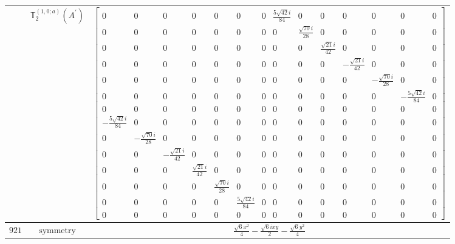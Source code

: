 \documentclass[fleqn,8pt,landscape]{jsarticle}
\begin{document}
\begin{longtable}{ccc}
$  $ & $ \mathbb{T}_{2}^{(1,0;a)}(A^{\prime}) $ & $ \begin{bmatrix} 0 & 0 & 0 & 0 & 0 & 0 & 0 & \frac{5 \sqrt{42} i}{84} & 0 & 0 & 0 & 0 & 0 & 0 \\ 0 & 0 & 0 & 0 & 0 & 0 & 0 & 0 & \frac{\sqrt{70} i}{28} & 0 & 0 & 0 & 0 & 0 \\ 0 & 0 & 0 & 0 & 0 & 0 & 0 & 0 & 0 & \frac{\sqrt{21} i}{42} & 0 & 0 & 0 & 0 \\ 0 & 0 & 0 & 0 & 0 & 0 & 0 & 0 & 0 & 0 & - \frac{\sqrt{21} i}{42} & 0 & 0 & 0 \\ 0 & 0 & 0 & 0 & 0 & 0 & 0 & 0 & 0 & 0 & 0 & - \frac{\sqrt{70} i}{28} & 0 & 0 \\ 0 & 0 & 0 & 0 & 0 & 0 & 0 & 0 & 0 & 0 & 0 & 0 & - \frac{5 \sqrt{42} i}{84} & 0 \\ 0 & 0 & 0 & 0 & 0 & 0 & 0 & 0 & 0 & 0 & 0 & 0 & 0 & 0 \\ - \frac{5 \sqrt{42} i}{84} & 0 & 0 & 0 & 0 & 0 & 0 & 0 & 0 & 0 & 0 & 0 & 0 & 0 \\ 0 & - \frac{\sqrt{70} i}{28} & 0 & 0 & 0 & 0 & 0 & 0 & 0 & 0 & 0 & 0 & 0 & 0 \\ 0 & 0 & - \frac{\sqrt{21} i}{42} & 0 & 0 & 0 & 0 & 0 & 0 & 0 & 0 & 0 & 0 & 0 \\ 0 & 0 & 0 & \frac{\sqrt{21} i}{42} & 0 & 0 & 0 & 0 & 0 & 0 & 0 & 0 & 0 & 0 \\ 0 & 0 & 0 & 0 & \frac{\sqrt{70} i}{28} & 0 & 0 & 0 & 0 & 0 & 0 & 0 & 0 & 0 \\ 0 & 0 & 0 & 0 & 0 & \frac{5 \sqrt{42} i}{84} & 0 & 0 & 0 & 0 & 0 & 0 & 0 & 0 \\ 0 & 0 & 0 & 0 & 0 & 0 & 0 & 0 & 0 & 0 & 0 & 0 & 0 & 0 \end{bmatrix} $ \\ \hline
$ 921 $ & $ \text{symmetry} $ & $ \frac{\sqrt{6} x^{2}}{4} - \frac{\sqrt{6} i x y}{2} - \frac{\sqrt{6} y^{2}}{4} $ \\

\end{longtable}
\end{document}
